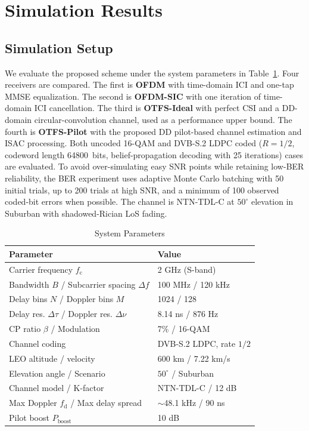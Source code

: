 ﻿\documentclass[conference]{IEEEtran}
\begin{document}
\section{Simulation Results}

\subsection{Simulation Setup}

We evaluate the proposed scheme under the system parameters in Table~\ref{tab:params}. Four receivers are compared. The first is \textbf{OFDM} with time-domain ICI and one-tap MMSE equalization. The second is \textbf{OFDM-SIC} with one iteration of time-domain ICI cancellation. The third is \textbf{OTFS-Ideal} with perfect CSI and a DD-domain circular-convolution channel, used as a performance upper bound. The fourth is \textbf{OTFS-Pilot} with the proposed DD pilot-based channel estimation and ISAC processing. Both uncoded 16-QAM and DVB-S.2 LDPC coded ($R = 1/2$, codeword length 64800~bits, belief-propagation decoding with 25 iterations) cases are evaluated. To avoid over-simulating easy SNR points while retaining low-BER reliability, the BER experiment uses adaptive Monte Carlo batching with 50 initial trials, up to 200 trials at high SNR, and a minimum of 100 observed coded-bit errors when possible. The channel is NTN-TDL-C at $50^\circ$ elevation in Suburban with shadowed-Rician LoS fading.

\begin{table}[t]
\centering
\caption{System Parameters}
\label{tab:params}
\renewcommand{\arraystretch}{1.1}
\begin{tabular}{l|l}
\hline
\textbf{Parameter} & \textbf{Value} \\
\hline
Carrier frequency $f_{\mathrm{c}}$ & 2 GHz (S-band) \\
Bandwidth $B$ / Subcarrier spacing $\Delta f$ & 100 MHz / 120 kHz \\
Delay bins $N$ / Doppler bins $M$ & 1024 / 128 \\
Delay res. $\Delta\tau$ / Doppler res. $\Delta\nu$ & 8.14 ns / 876 Hz \\
CP ratio $\beta$ / Modulation & 7\% / 16-QAM \\
Channel coding & DVB-S.2 LDPC, rate $1/2$ \\
LEO altitude / velocity & 600 km / 7.22 km/s \\
Elevation angle / Scenario & $50^\circ$ / Suburban \\
Channel model / K-factor & NTN-TDL-C / 12 dB \\
Max Doppler $f_{\mathrm{d}}$ / Max delay spread & $\sim$48.1 kHz / 90 ns \\
Pilot boost $P_{\mathrm{boost}}$ & 10 dB \\
\hline
\end{tabular}
\end{table}
\end{document}
